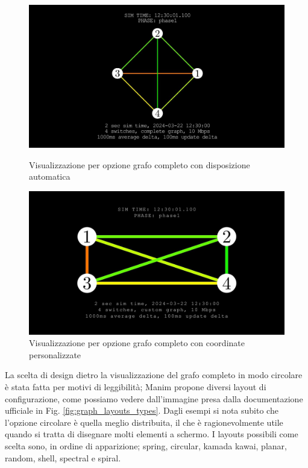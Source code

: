 \documentclass[binding=0.6cm]{sapthesis}
\begin{document}
\begin{figure}[h]
    \centering
    \begin{minipage}{0.46\textwidth}
      \includegraphics[width=\linewidth]{immagini/custom_complete_autopositioning.JPG}
      \caption{Visualizzazione per opzione grafo completo con disposizione automatica}
      \label{fig:custom_complete_autopositioning}
    \end{minipage}\hfill
    \begin{minipage}{0.47\textwidth}
      \includegraphics[width=\linewidth]{immagini/custom_complete_manual_positioning.JPG}
      \caption{Visualizzazione per opzione grafo completo con coordinate personalizzate}
      \label{fig:custom_complete_manual_positioning}
    \end{minipage}
\end{figure}


La scelta di design dietro la visualizzazione del grafo completo in modo circolare è stata fatta per motivi di leggibilità; Manim propone diversi
layout di configurazione, come possiamo vedere dall'immagine presa dalla documentazione ufficiale \cite{manimGraph} in Fig. \ref{fig:graph_layouts_types}. Dagli esempi
si nota subito che l'opzione circolare è quella meglio distribuita, il che è ragionevolmente utile quando si tratta di disegnare molti elementi a schermo. 
I layouts possibili come scelta sono, in ordine di apparizione; spring, circular, kamada kawai, planar, random, shell, spectral e spiral.
\end{document}

